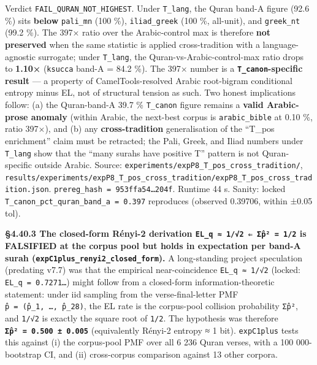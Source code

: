 \documentclass[
]{article}
\begin{document}
Verdict \texttt{FAIL\_QURAN\_NOT\_HIGHEST}. Under \texttt{T\_lang}, the
Quran band-A figure (92.6 \%) sits \textbf{below} \texttt{pali\_mn} (100
\%), \texttt{iliad\_greek} (100 \%, all-unit), and \texttt{greek\_nt}
(99.2 \%). The 397× ratio over the Arabic-control max is therefore
\textbf{not preserved} when the same statistic is applied
cross-tradition with a language-agnostic surrogate; under
\texttt{T\_lang}, the Quran-vs-Arabic-control-max ratio drops to
\textbf{1.10×} (\texttt{ksucca} band-A = 84.2 \%). The 397× number is a
\textbf{\texttt{T\_canon}-specific result} --- a property of
CamelTools-resolved Arabic root-bigram conditional entropy minus EL, not
of structural tension as such. Two honest implications follow: (a) the
Quran-band-A 39.7 \% \texttt{T\_canon} figure remains a \textbf{valid
Arabic-prose anomaly} (within Arabic, the next-best corpus is
\texttt{arabic\_bible} at 0.10 \%, ratio 397×), and (b) any
\textbf{cross-tradition} generalisation of the ``T\_pos enrichment''
claim must be retracted; the Pali, Greek, and Iliad numbers under
\texttt{T\_lang} show that the ``many surahs have positive T'' pattern
is not Quran-specific outside Arabic. Source:
\texttt{experiments/expP8\_T\_pos\_cross\_tradition/},
\texttt{results/experiments/expP8\_T\_pos\_cross\_tradition/expP8\_T\_pos\_cross\_tradition.json}.
\texttt{prereg\_hash\ =\ 953ffa54…204f}. Runtime 44 s. Sanity: locked
\texttt{T\_canon\_pct\_quran\_band\_a\ =\ 0.397} reproduces (observed
0.39706, within ±0.05 tol).

\textbf{§4.40.3 The closed-form Rényi-2 derivation
\texttt{EL\_q\ ≈\ 1/√2\ ⇐\ Σp̂²\ =\ 1/2} is FALSIFIED at the corpus pool
but holds in expectation per band-A surah
(\texttt{expC1plus\_renyi2\_closed\_form}).} A long-standing project
speculation (predating v7.7) was that the empirical near-coincidence
\texttt{EL\_q\ ≈\ 1/√2} (locked: \texttt{EL\_q\ =\ 0.7271…}) might
follow from a closed-form information-theoretic statement: under iid
sampling from the verse-final-letter PMF
\texttt{p̂\ =\ (p̂\_1,\ …,\ p̂\_28)}, the EL rate is the corpus-pool
collision probability \texttt{Σp̂²}, and \texttt{1/√2} is exactly the
square root of \texttt{1/2}. The hypothesis was therefore
\textbf{\texttt{Σp̂²\ =\ 0.500\ ±\ 0.005}} (equivalently Rényi-2 entropy
≈ 1 bit). \texttt{expC1plus} tests this against (i) the corpus-pool PMF
over all 6 236 Quran verses, with a 100 000-bootstrap CI, and (ii)
cross-corpus comparison against 13 other corpora.
\end{document}
